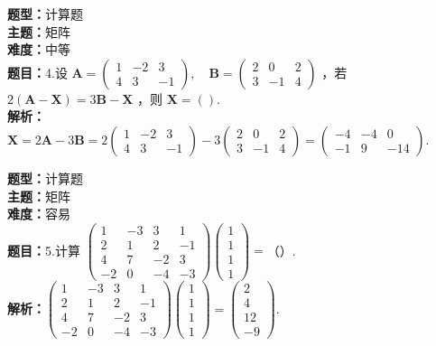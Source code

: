 \documentclass{ctexart}
\newenvironment{question}[5]{%
	\noindent\textbf{题型：}#1\\
	\textbf{主题：}#2\\
	\textbf{难度：}#3\\
	\textbf{题目：}#4\\
	\textbf{解析：}#5\\
	\vspace{1em}
}{}
\begin{document}
	\begin{question}
		{计算题}
		{矩阵}
		{中等}
		{4.设 \(\mathbf{A}=\left(\begin{array}{ccc}1 & -2 & 3 \\ 4 & 3 & -1\end{array}\right), \quad \mathbf{B}=\left(\begin{array}{ccc}2 & 0 & 2 \\ 3 & -1 & 4\end{array}\right)\) ，若 \(2(\mathbf{A}-\mathbf{X})=3 \mathbf{B}-\mathbf{X}\) ，则 \(\mathbf{X}=()\).}
		{\(\mathbf{X}=2 \mathbf{A}-3 \mathbf{B}=2\left(\begin{array}{ccc}1 & -2 & 3 \\ 4 & 3 & -1\end{array}\right)-3\left(\begin{array}{ccc}2 & 0 & 2 \\ 3 & -1 & 4\end{array}\right)=\left(\begin{array}{ccc}-4 & -4 & 0 \\ -1 & 9 & -14\end{array}\right)\).}
	\end{question}
	
	\begin{question}
		{计算题}
		{矩阵}
		{容易}
		{5.计算 \(\left(\begin{array}{cccc}1 & -3 & 3 & 1 \\ 2 & 1 & 2 & -1 \\ 4 & 7 & -2 & 3 \\ -2 & 0 & -4 & -3\end{array}\right)\left(\begin{array}{l}1 \\ 1 \\ 1 \\ 1\end{array}\right)=\)（）. }
		{\(\left(\begin{array}{cccc}1 & -3 & 3 & 1 \\ 2 & 1 & 2 & -1 \\ 4 & 7 & -2 & 3 \\ -2 & 0 & -4 & -3\end{array}\right)\left(\begin{array}{l}1 \\ 1 \\ 1 \\ 1\end{array}\right)=\left(\begin{array}{c}2 \\ 4 \\ 12 \\ -9\end{array}\right)\).}
	\end{question}
	
\end{document}
